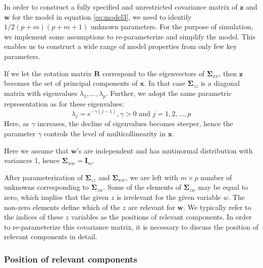 \documentclass[3p,times,12pt,authoryear]{elsarticle}
\providecommand{\tightlist}{%
  \setlength{\itemsep}{0pt}\setlength{\parskip}{0pt}}
\theoremstyle{definition}
\theoremstyle{definition}
\theoremstyle{remark}
\begin{document}
In order to construct a fully specified and unrestricted covariance
matrix of \(\mathbf{z}\) and \(\mathbf{w}\) for the model in equation
\eqref{eq:model3}, we need to identify \(1/2 (p+m)(p+m+1)\) unknown
parameters. For the purpose of simulation, we implement some assumptions
to re-parameterize and simplify the model. This enables us to construct
a wide range of model properties from only few key parameters.

\begin{description}
\tightlist
\item[\textbf{Parameterization of \(\boldsymbol{\Sigma}_{zz}\)}]
If we let the rotation matrix \(\mathbf{R}\) correspond to the
eigenvectors of \(\boldsymbol{\Sigma}_{xx}\), then \(\mathbf{z}\)
becomes the set of principal components of \(\mathbf{x}\). In that case
\(\boldsymbol{\Sigma}_{zz}\) is a diagonal matrix with eigenvalues
\(\lambda_1, \ldots, \lambda_p\). Further, we adopt the same parametric
representation as \citet{saebo2015simrel} for these eigenvalues:
\[\lambda_j = e^{-\gamma(j - 1)}, \gamma >0 \text{ and } j = 1, 2, \ldots, p\]
Here, as \(\gamma\) increases, the decline of eigenvalues becomes
steeper, hence the parameter \(\gamma\) controls the level of
multicollinearity in \(\mathbf{x}\).
\item[\textbf{Parameterization of \(\boldsymbol{\Sigma}_{ww}\)}]
Here we assume that \(\mathbf{w}\)'s are independent and has mutinormal
distribution with variances 1, hence
\(\boldsymbol{\Sigma}_{ww} = \mathbf{I}_m\).
\item[\textbf{Parameterization of \(\boldsymbol{\Sigma}_{zw}\)}]
After parameterization of \(\boldsymbol{\Sigma}_{zz}\) and
\(\boldsymbol{\Sigma}_{ww}\), we are left with \(m \times p\) number of
unknowns corresponding to \(\boldsymbol{\Sigma}_{zw}\). Some of the
elements of \(\boldsymbol{\Sigma}_{zw}\) may be equal to zero, which
implies that the given \(z\) is irrelevant for the given variable \(w\).
The non-zero elements define which of the \(z\) are relevant for
\(\mathbf{w}\). We typically refer to the indices of these \(z\)
variables as the positions of relevant components. In order to
re-parameterize this covariance matrix, it is necessary to discuss the
position of relevant components in detail.
\end{description}

\subsubsection{Position of relevant
components}\label{position-of-relevant-components}
\end{document}
